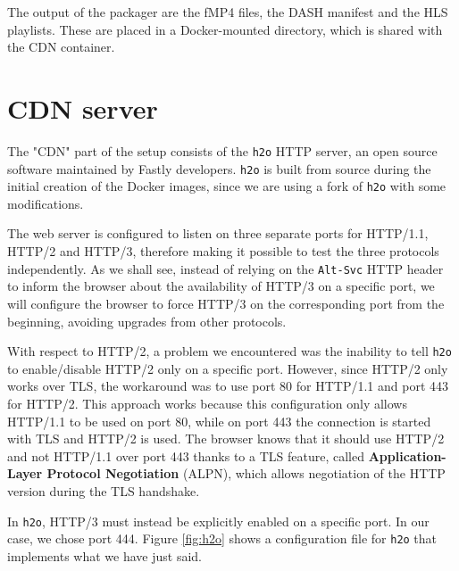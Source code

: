 The output of the packager are the fMP4 files, the DASH manifest and the HLS playlists. These are placed in a Docker-mounted directory, which is shared with the CDN container.

\section{CDN server}
\label{sec:testbed/cdn}

The "CDN" part of the setup consists of the \texttt{h2o} HTTP server, an open source software maintained by Fastly developers. \texttt{h2o} is built from source during the initial creation of the Docker images, since we are using a fork of \texttt{h2o} with some modifications.

The web server is configured to listen on three separate ports for HTTP/1.1, HTTP/2 and HTTP/3, therefore making it possible to test the three protocols independently. As we shall see, instead of relying on the \texttt{Alt-Svc} HTTP header to inform the browser about the availability of HTTP/3 on a specific port, we will configure the browser to force HTTP/3 on the corresponding port from the beginning, avoiding upgrades from other protocols.

With respect to HTTP/2, a problem we encountered was the inability to tell \texttt{h2o} to enable/disable HTTP/2 only on a specific port. However, since HTTP/2 only works over TLS, the workaround was to use port 80 for HTTP/1.1 and port 443 for HTTP/2. This approach works because this configuration only allows HTTP/1.1 to be used on port 80, while on port 443 the connection is started with TLS and HTTP/2 is used. The browser knows that it should use HTTP/2 and not HTTP/1.1 over port 443 thanks to a TLS feature, called \textbf{Application-Layer Protocol Negotiation} (ALPN), which allows negotiation of the HTTP version during the TLS handshake.

In \texttt{h2o}, HTTP/3 must instead be explicitly enabled on a specific port. In our case, we chose port 444. Figure \ref{fig:h2o} shows a configuration file for \texttt{h2o} that implements what we have just said.


